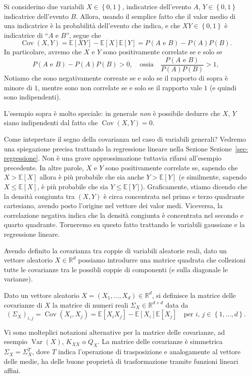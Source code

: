 \documentclass[
  italian,
  letterpaper,
]{book}
\newcommand{\bra}[1]{\left( #1 \right)}
\newcommand{\sqa}[1]{\left[ #1 \right]}
\newcommand{\cur}[1]{\left\{ #1 \right\}}
\newcommand{\R}{\mathbb{R}}
\newcommand{\E}[1]{\mathbb{E}\sqa{#1}}
\newcommand{\Var}[1]{\operatorname{Var}\bra{#1}}
\newcommand{\Cov}[1]{\operatorname{Cov}\bra{#1}}
\theoremstyle{definition}
\theoremstyle{remark}
\begin{document}
Si considerino due variabili \(X \in \cur{0,1}\), indicatrice
dell'evento \(A\), \(Y \in \cur{0,1}\) indicatrice dell'evento \(B\).
Allora, usando il semplice fatto che il valor medio di una indicatrice è
la probabilità dell'evento che indica, e che \(XY \in \cur{0,1}\) è
indicatrice di ``\(A\) e \(B\)'', segue che
\[ \Cov{X,Y} = \E{XY} - \E{X}\E{Y} = P(A \text{ e  } B) - P(A) P(B).\]
In particolare, avremo che \(X\) e \(Y\) sono positivamente correlate se
e solo se
\[ P(A \text{ e  } B) - P(A) P(B) >0, \quad \text{ossia} \quad \frac{ P(A \text{ e } B) }{P(A) P(B) } >1,\]
Notiamo che sono negativamente correate se e solo se il rapporto di
sopra è minore di \(1\), mentre sono non correlate se e solo se il
rapporto vale \(1\) (e quindi sono indipendenti).

L'esempio sopra è molto speciale: in generale \emph{non} è possibile
dedurre che \(X\), \(Y\) siano indipendenti dal fatto che
\(\Cov{X,Y}=0\).

Come intepretare il segno della covarianza nel caso di variabili
generali? Vedremo una spiegazione precisa trattando la regressione
lineare nella Sezione Sezione~\ref{sec-regressione}. Non è una grave
approssimazione tuttavia rifarsi all'esempio precedente. In altre
parole, \(X\) e \(Y\) sono positivamente correlate se, sapendo che
\(X>\E{X}\) allora è più probabile che sia anche \(Y>\E{Y}\) (e
similmente, sapendo \(X\le \E{X}\), è più probabile che sia
\(Y \le \E{Y}\)). Graficamente, stiamo dicendo che la densità congiunta
tra \((X,Y)\) è circa concentrata nel primo e terzo quadrante
cartesiano, avendo posto l'origine nel vettore dei valor medi.
Viceversa, la correlazione negativa indica che la densità congiunta è
concentrata nel secondo e quarto quadrante. Torneremo su questo fatto
trattando le variabili gaussiane e la regressione lineare.

Avendo definito la covarianza tra coppie di variabili aleatorie reali,
dato un vettore aleatorio \(X \in \R^d\) possiamo introdurre una matrice
quadrata che collezioni tutte le covarianze tra le possibli coppie di
componenti (e sulla diagonale le varianze).

Dato un vettore aleatorio \(X = (X_1, \ldots, X_d) \in \R^d\), si
definisce la matrice delle covarianze di \(X\) la matrice di numeri
reali \(\Sigma_X \in \R^{d\times d}\) data da
\[ (\Sigma_X)_{i,j} = \Cov{X_i, X_j} = \E{X_iX_j} - \E{X_i}\E{X_j} \quad \text{per $i$, $j \in \cur{1, \ldots, d}$.}\]

Vi sono molteplici notazioni alternative per la matrice delle
covarianze, ad esempio \(\Var{X}\), \(K_{XX}\) o \(Q_X\). La matrice
delle covarianze è simmetrica \(\Sigma_X = \Sigma_X^T\), dove \(T\)
indica l'operazione di trasposizione e analogamente al vettore delle
medie, ha delle buone proprietà di trasformazione tramite funzioni
lineari affini.
\end{document}
